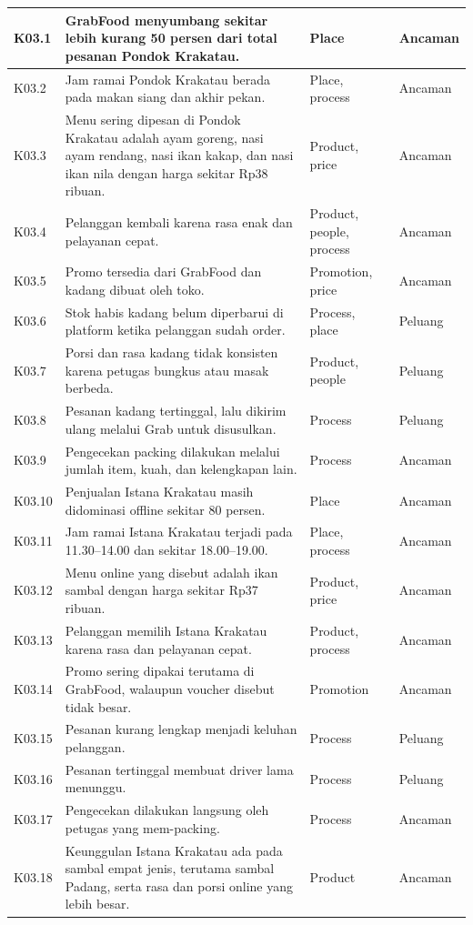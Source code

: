 \begin{xltabular}{\textwidth}{|C{1.0cm}|Y|L{2.6cm}|L{2.0cm}|}
K03.1 & GrabFood menyumbang sekitar lebih kurang 50 persen dari total pesanan Pondok Krakatau. & Place & Ancaman \\ \hline
K03.2 & Jam ramai Pondok Krakatau berada pada makan siang dan akhir pekan. & Place, process & Ancaman \\ \hline
K03.3 & Menu sering dipesan di Pondok Krakatau adalah ayam goreng, nasi ayam rendang, nasi ikan kakap, dan nasi ikan nila dengan harga sekitar Rp38 ribuan. & Product, price & Ancaman \\ \hline
K03.4 & Pelanggan kembali karena rasa enak dan pelayanan cepat. & Product, people, process & Ancaman \\ \hline
K03.5 & Promo tersedia dari GrabFood dan kadang dibuat oleh toko. & Promotion, price & Ancaman \\ \hline
K03.6 & Stok habis kadang belum diperbarui di platform ketika pelanggan sudah order. & Process, place & Peluang \\ \hline
K03.7 & Porsi dan rasa kadang tidak konsisten karena petugas bungkus atau masak berbeda. & Product, people & Peluang \\ \hline
K03.8 & Pesanan kadang tertinggal, lalu dikirim ulang melalui Grab untuk disusulkan. & Process & Peluang \\ \hline
K03.9 & Pengecekan packing dilakukan melalui jumlah item, kuah, dan kelengkapan lain. & Process & Ancaman \\ \hline
K03.10 & Penjualan Istana Krakatau masih didominasi offline sekitar 80 persen. & Place & Ancaman \\ \hline
K03.11 & Jam ramai Istana Krakatau terjadi pada 11.30--14.00 dan sekitar 18.00--19.00. & Place, process & Ancaman \\ \hline
K03.12 & Menu online yang disebut adalah ikan sambal dengan harga sekitar Rp37 ribuan. & Product, price & Ancaman \\ \hline
K03.13 & Pelanggan memilih Istana Krakatau karena rasa dan pelayanan cepat. & Product, process & Ancaman \\ \hline
K03.14 & Promo sering dipakai terutama di GrabFood, walaupun voucher disebut tidak besar. & Promotion & Ancaman \\ \hline
K03.15 & Pesanan kurang lengkap menjadi keluhan pelanggan. & Process & Peluang \\ \hline
K03.16 & Pesanan tertinggal membuat driver lama menunggu. & Process & Peluang \\ \hline
K03.17 & Pengecekan dilakukan langsung oleh petugas yang mem-packing. & Process & Ancaman \\ \hline
K03.18 & Keunggulan Istana Krakatau ada pada sambal empat jenis, terutama sambal Padang, serta rasa dan porsi online yang lebih besar. & Product & Ancaman \\ \hline
\end{xltabular}
\endgroup

